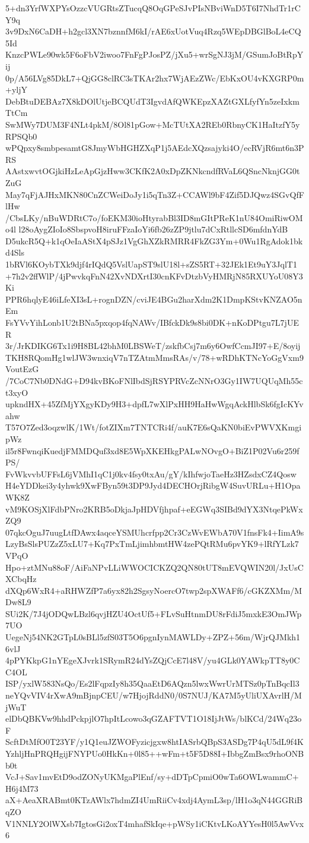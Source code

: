 5+dn3YrfWXPYsOzzcVUGRtsZTucqQ8OqGPeSJvPIsNBviWnD5T6I7NhdTr1rCY9q
3v9DxN6CaDH+h2gcl3XN7bznnfM6kI/rAE6xUotVuq4Rzq5WEpDBGlBoL4eCQ5Id
KnzcPWLe90wk5F6oFbV2iwoo7FnFgPJosPZ/jXu5+wrSgNJ3jM/GSumJoBtRpYij
0p/A56LVg85DkL7+QjGG8clRC3sTKAr2hx7WjAEzZWc/EbKxOU4vKXGRP0m+yljY
DebBtuDEBAz7X8kDOlUtjeBCQUdT3IgvdAfQWKEpzXAZtGXLfyfYn5zeIxkmTtCm
SwMWy7DUM3F4NLt4pkM/8Ol81pGow+McTUtXA2REb0RbnyCK1HaItzfY5yRPSQb0
wPQpxy8smbpesamtG8JmyWbHGHZXqP1j5AEdcXQzsajyki4O/ecRVjR6mt6n3PRS
AAstxwvtOGjkiHzLeApGjzHww3CKfK2A0xDpZKNkcndfRVaL6QSncNknjGG0tZuG
May7qFjAJHxMKN80CnZCWeiDoJy1i5qTn3Z+CCAWl9bF4Zif5DJQwz4SGvQfFlHw
/CbsLKy/nBuWDRtC7o/foEKM30ioHtyrabBl3ID8mGItPReK1nU84OmiRiwOMo4l
l28oAygZIoIo8SbspvoH8iruFFzaIoYi6fb26zZP9jtlu7dCxRtllcSD6mfdnYdB
D5ukcR5Q+k1qOeIaAStX4pSJz1VgGhXZkRMRR4FkZG3Ym+0Wu1RgAdok1bkd4Sls
1bRVl6KOybTXk9djf4rIQdQ5VslUapST9slU18l+sZS5RT+32JEk1Et9uY3JqlT1
+7h2v2ffWlP/4jPwvkqFnN42XvNDXrtI30cnKFvDtzbVyHMRjN85RXUYoU08Y3Ki
PPR6hqlyE46iLfeXI3sL+rognDZN/cviJE4BGu2harXdm2K1DmpKStvKNZAO5nEm
FsYVvYihLonb1U2tBNa5pxqop4fqNAWv/IBfckDk9s8bi0DK+nKoDPtgu7L7jUER
3r/JrKDIKG6Tx1i9H8BL42bhM0LBSWeT/zskfbCsj7m6y6OwfCcmJI97+E/8oyij
TKH8RQomHg1wlJW3wnxiqV7nTZAtmMmsRAs/v/78+wRDhKTNcYoGgVxm9VoutEzG
/7CoC7Nb0DNdG+D94kvBKoFNlIbdSjRSYPRVcZcNNrO3Gy1IW7UQUqMh55ct3xyO
upkndHX+45ZfMjYXgyKDy9H3+dpfL7wXlPxHH9HaHwWgqAckHlbSk6fgIcKYvahw
T57O7Zed3oqzwlK/1Wt/fotZIXm7TNTCRi4f/auK7E6sQaKN0biEvPWVXKmgipWz
il5r8FwnqiKuedjFMMDQuf3xd8E5WpXKEHkgPALwNOvgO+BiZ1P02Vu6r259fPS/
FvWkvvbUFFsL6jVMhI1qC1j0kv4fsy0txAu/gY/kIhfwjoTaeHz3HZsdxCZ4Qosw
H4eYDDkei3y4yhwk9XwFByn59t3DP9Jyd4DECHOrjRibgW4SuvURLu+H1OpaWK8Z
vM9KOSjXlFdbPNro2KRB5oDkjaJpHDVfjhpaf+eEGWq3SIBd9dYX3NtqePkWxZQ9
07qkcOguJ7uugLtfDAwx4aqceYSMUhcrfpp2Cr3CzWvEWbA70V1fnsFk4+IimA9s
LzyBsSlsPUZzZ5xLU7+Kq7PxTmLjimhbmtHW4zePQtRMu6pvYK9+lRfYLzk7VPqO
Hpo+ztMNu88oF/AiFaNPvLLiWWOCICKZQ2QN80tUT8mEVQWIN20l/JxUsCXCbqHz
dXQp6WxR4+aRHWZfP7a6yx82h2SgsyNoercO7twp2spXWAFf6/cGKZXMm/MDw8L9
SUi2K/7J4jODQwLBzl6qvjHZU4OctUf5+FLvSuHtnmDU8rFdiJ5mxkE3OmJWp7UO
UegeNj54NK2GTpL0sBLl5zfS03T5O6pgnIynMAWLDy+ZPZ+56m/WjrQJMkh16vlJ
4pPYKkpG1nYEgeXJvrk1SRymR24dYsZQjCcE7l48V/yu4GLk0YAWkpTT8y0CC4OL
ISP/yxlW583NsQo/Es2lFqpzIy8h35QaaEtD6AQzn5lwxWwrUrMTSz0pTnBqcIl3
neYQvVIV4rXwA9mBjnpCEU/w7HjojRddN0/0S7NUJ/KA7M5yUliUXAvrlH/MjWuT
elDbQBKVw9hhdPckpjlO7hpItLcowo3qGZAFTVT1O18IjJtWs/blKCd/24Wq23oF
ScftDtMfO0T23YF/y1Q1euJZWOFyzicjgxw8htIASrbQBpS3ASDg7P4qU5dL9f4K
YzhljHnPRQHgijFNYPUo0HkKn+0l85++wFm+t5F5D88I+IbbgZmBsx9rhoONBb0t
VcJ+Sav1mvEtD9odZONyUKMgaPlEnf/sy+dDTpCpmiO0wTa6OWLwammC+H6j4M73
aX+AeaXRABmt0KTzAWlx7hdmZI4UmRiiCv4xdj4AymL3sp/lH1o3qN44GGRiBqZO
V1NNLY2OlWXsb7IgtosGi2oxT4mhafSkIqe+pWSy1iCKtvLKoAYYesH0l5AwVvx6
